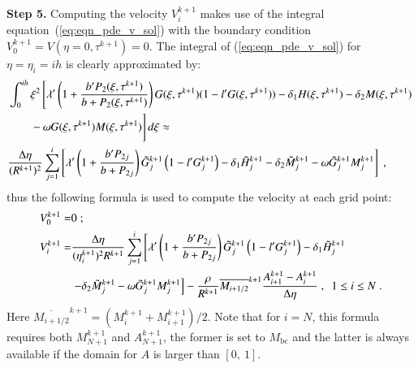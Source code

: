\documentclass{amsart}
\theoremstyle{definition}
\theoremstyle{remark}
\numberwithin{equation}{section}
\numberwithin{figure}{section}
\begin{document}
\noindent
{\bf Step 5.} Computing the velocity $V_i^{k+1}$ makes use of the integral equation~(\ref{eq:eqn_pde_v_sol}) with the boundary condition $V_0^{k+1} = V(\eta=0,\tau^{k+1}) = 0$.
The integral of (\ref{eq:eqn_pde_v_sol}) for $\eta=\eta_i=ih$ is clearly approximated by:
\begin{align*}
&\int_0^{ih}\xi^2\left[\lambda'\left(1+\frac{b'P_2(\xi,\tau^{k+1})}{b+P_2(\xi,\tau^{k+1})}\right)G(\xi,\tau^{k+1})(1-l'G(\xi,\tau^{k+1}))-\delta_1 H(\xi,\tau^{k+1})-\delta_2M(\xi,\tau^{k+1})\right. \\
&\hspace*{.24in}\left.\vphantom{\left(1+\frac{b'P_2(\xi,\tau^{k+1})}{b+P_2(\xi,\tau^{k+1})}\right)}-\omega G(\xi,\tau^{k+1})M(\xi,\tau^{k+1})\right]d\xi
\approx \\
&\frac{\Delta\eta}{(R^{k+1})^2}\sum_{j=1}^i\left[\lambda'\left(1+\frac{b'P_{2j}}{b+P_{2j}}\right)\tilde{G}_j^{k+1}\left(1-l'G_j^{k+1}\right)-\delta_1\tilde{H}_j^{k+1}-\delta_2\tilde{M}_j^{k+1}-\omega \tilde{G}_j^{k+1}M_j^{k+1}\right]\;,
\end{align*}
thus the following formula is used to compute the velocity at each grid point:
\begin{align}
\label{eq:num_gen_v_0}
V_0^{k+1} =& 0\;; \\
\label{eq:num_gen_v_i}
V_i^{k+1} =& \frac{\Delta\eta}{(\eta_i^{k+1})^2R^{k+1}}\sum_{j=1}^i\left[\lambda'\left(1+\frac{b'P_{2j}}{b+P_{2j}}\right)\tilde{G}_j^{k+1}\left(1-l'G_j^{k+1}\right)-\delta_1\tilde{H}_j^{k+1}\right. \\
\notag
& \left.-\delta_2\tilde{M}_j^{k+1}-\omega \tilde{G}_j^{k+1}M_j^{k+1}\right] - \frac{\rho}{R^{k+1}}\overline{M_{i+1/2}}^{k+1}\frac{A_{i+1}^{k+1}-A_i^{k+1}}{\Delta\eta}\;,\ \ 1\le i\le N\;.
\end{align}
Here $\overline{M_{i+1/2}}^{k+1} = (M_i^{k+1}+M_{i+1}^{k+1})/2$.
Note that for $i=N$, this formula requires both $M_{N+1}^{k+1}$ and $A_{N+1}^{k+1}$, the former is set to $M_{\textrm{bc}}$ and the latter is always available if the domain for $A$ is larger than $[0,\ 1]$.
\end{document}
